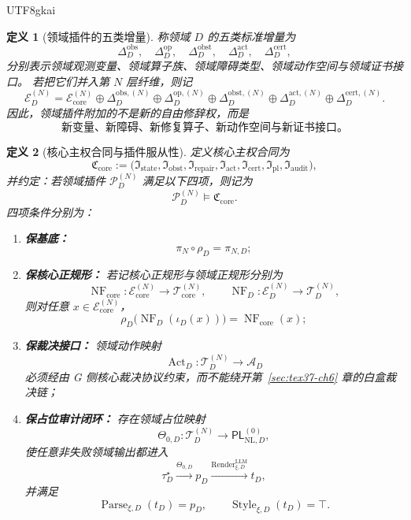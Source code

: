 \documentclass[12pt]{article}
\newtheorem{definition}{定义}[section]
\newcommand{\Parse}{\operatorname{Parse}}
\newcommand{\Render}{\operatorname{Render}}
\newcommand{\Style}{\operatorname{Style}}
\begin{document}
\begin{CJK*}{UTF8}{gkai}
\begin{definition}[领域插件的五类增量]
\label{def:tex37-ch7-five-increments}
称领域 $D$ 的五类标准增量为
\[
  \Delta_D^{\mathrm{obs}},
  \quad
  \Delta_D^{\mathrm{op}},
  \quad
  \Delta_D^{\mathrm{obst}},
  \quad
  \Delta_D^{\mathrm{act}},
  \quad
  \Delta_D^{\mathrm{cert}},
\]
分别表示领域观测变量、领域算子族、领域障碍类型、领域动作空间与领域证书接口。
若把它们并入第 $N$ 层纤维，则记
\[
  \mathcal E_D^{(N)}
  =
  \mathcal E_{\mathrm{core}}^{(N)}
  \oplus
  \Delta_D^{\mathrm{obs},(N)}
  \oplus
  \Delta_D^{\mathrm{op},(N)}
  \oplus
  \Delta_D^{\mathrm{obst},(N)}
  \oplus
  \Delta_D^{\mathrm{act},(N)}
  \oplus
  \Delta_D^{\mathrm{cert},(N)}.
\]
因此，领域插件附加的不是新的自由修辞权，而是
\[
  \boxed{
    \text{新变量、新障碍、新修复算子、新动作空间与新证书接口。}
  }
\]
\end{definition}

\begin{definition}[核心主权合同与插件服从性]
\label{def:tex37-ch7-core-contract}
定义核心主权合同为
\[
  \mathfrak C_{\mathrm{core}}
  :=
  \bigl(
    \mathfrak I_{\mathrm{state}},
    \mathfrak I_{\mathrm{obst}},
    \mathfrak I_{\mathrm{repair}},
    \mathfrak I_{\mathrm{act}},
    \mathfrak I_{\mathrm{cert}},
    \mathfrak I_{\mathrm{pl}},
    \mathfrak I_{\mathrm{audit}}
  \bigr),
\]
并约定：若领域插件 $\mathcal P_D^{(N)}$ 满足以下四项，则记为
\[
  \mathcal P_D^{(N)}\models \mathfrak C_{\mathrm{core}}.
\]
四项条件分别为：
\begin{enumerate}
  \item \textbf{保基底：}
  \[
    \pi_N\circ \rho_D=\pi_{N,D};
  \]
  \item \textbf{保核心正规形：}
  若记核心正规形与领域正规形分别为
  \[
    \operatorname{NF}_{\mathrm{core}}:\mathcal E_{\mathrm{core}}^{(N)}\to \mathcal T_{\mathrm{core}}^{(N)},
    \qquad
    \operatorname{NF}_D:\mathcal E_D^{(N)}\to \mathcal T_D^{(N)},
  \]
  则对任意 $x\in\mathcal E_{\mathrm{core}}^{(N)}$，
  \[
    \rho_D\bigl(\operatorname{NF}_D(\iota_D(x))\bigr)
    =
    \operatorname{NF}_{\mathrm{core}}(x);
  \]
  \item \textbf{保裁决接口：}
  领域动作映射
  \[
    \operatorname{Act}_D:\mathcal T_D^{(N)}\to \mathcal A_D
  \]
  必须经由 G 侧核心裁决协议约束，而不能绕开第~\ref{sec:tex37-ch6} 章的白盒裁决链；
  \item \textbf{保占位审计闭环：}
  存在领域占位映射
  \[
    \Theta_{0,D}:\mathcal T_D^{(N)}\to \mathsf{PL}_{\mathrm{NL},D}^{(0)},
  \]
  使任意非失败领域输出都进入
  \[
    \tau_D^\star
    \xrightarrow{\Theta_{0,D}}
    p_D
    \xrightarrow{\Render^{\mathrm{LLM}}_{\xi,D}}
    t_D,
  \]
  并满足
  \[
    \Parse_{\xi,D}(t_D)=p_D,
    \qquad
    \Style_{\xi,D}(t_D)=\top.
  \]
\end{enumerate}
\end{definition}


\end{CJK*}
\end{document}
